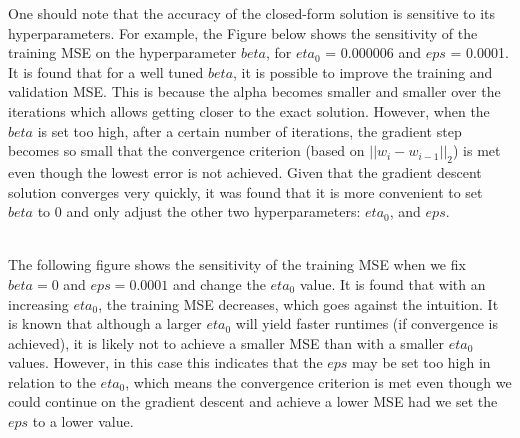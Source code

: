\documentclass[11pt]{article}
\begin{document}
One should note that the accuracy of the closed-form solution is sensitive to its hyperparameters. For example, the Figure below shows the sensitivity of the training MSE on the hyperparameter $beta$, for $eta_0$ = 0.000006 and $eps$ = 0.0001. It is found that for a well tuned $beta$, it is possible to improve the training and validation MSE. This is because the alpha becomes smaller and smaller over the iterations which allows getting closer to the exact solution. However, when the $beta$ is set too high, after a certain number of iterations, the gradient step becomes so small that the convergence criterion (based on  $||w_{i} - w_{i-1}||_{2}$) is met even though the lowest error is not achieved. Given that the gradient descent solution converges very quickly, it was found that it is more convenient to set $beta$ to 0 and only adjust the other two hyperparameters: $eta_0$, and $eps$.\\ 
\\

The following figure shows the sensitivity of the training MSE when we fix $beta = 0$ and $eps = 0.0001$ and change the $eta_0$ value. It is found that with an increasing $eta_0$, the training MSE decreases, which goes against the intuition. It is known that although a larger $eta_0$ will yield faster runtimes (if convergence is achieved), it is likely not to achieve a smaller MSE than with a smaller $eta_0$ values. However, in this case this indicates that the $eps$ may be set too high in relation to the $eta_0$, which means the convergence criterion is met even though we could continue on the gradient descent and achieve a lower MSE had we set the $eps$ to a lower value.\\ 
\\ 
\end{document}
